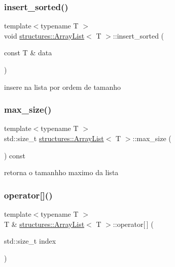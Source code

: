 \subsubsection{\texorpdfstring{insert\_sorted()}{insert\_sorted()}}
{\footnotesize\ttfamily template$<$typename T $>$ \\
void \mbox{\hyperlink{classstructures_1_1ArrayList}{structures\+::\+Array\+List}}$<$ T $>$\+::insert\+\_\+sorted (\begin{DoxyParamCaption}\item[{const T \&}]{data }\end{DoxyParamCaption})}



insere na lista por ordem de tamanho 

\mbox{\label{classstructures_1_1ArrayList_a8f0772886f296281ea03af9578f67969}} 
\subsubsection{\texorpdfstring{max\_size()}{max\_size()}}
{\footnotesize\ttfamily template$<$typename T $>$ \\
std\+::size\+\_\+t \mbox{\hyperlink{classstructures_1_1ArrayList}{structures\+::\+Array\+List}}$<$ T $>$\+::max\+\_\+size (\begin{DoxyParamCaption}{ }\end{DoxyParamCaption}) const}



retorna o tamanhho maximo da lista 

\mbox{\label{classstructures_1_1ArrayList_a1ff71f9c1ebce9408c52115651ab4e77}} 
\subsubsection{\texorpdfstring{operator[]()}{operator[]()}\hspace{0.1cm}{\footnotesize\ttfamily [1/2]}}
{\footnotesize\ttfamily template$<$typename T $>$ \\
T \& \mbox{\hyperlink{classstructures_1_1ArrayList}{structures\+::\+Array\+List}}$<$ T $>$\+::operator\mbox{[}$\,$\mbox{]} (\begin{DoxyParamCaption}\item[{std\+::size\+\_\+t}]{index }\end{DoxyParamCaption})}



